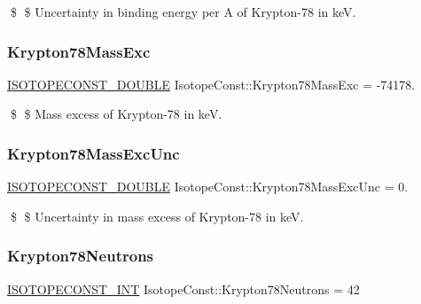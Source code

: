 \$ \$ Uncertainty in binding energy per A of Krypton-\/78 in keV. \mbox{\label{group___isotope_const-_krypton-_kr78_gadaa8a09b24a22fd688ae5db93b627695}} 
\subsubsection{\texorpdfstring{Krypton78\+Mass\+Exc}{Krypton78MassExc}}
{\footnotesize\ttfamily \mbox{\hyperlink{group___isotope_const-_macros_ga8f45a7272ce02c0b4c65c44636ed719a}{I\+S\+O\+T\+O\+P\+E\+C\+O\+N\+S\+T\+\_\+\+D\+O\+U\+B\+LE}} Isotope\+Const\+::\+Krypton78\+Mass\+Exc = -\/74178.}

\$ \$ Mass excess of Krypton-\/78 in keV. \mbox{\label{group___isotope_const-_krypton-_kr78_ga22d518fd6503c6df3ce0cb87b3fb03a9}} 
\subsubsection{\texorpdfstring{Krypton78\+Mass\+Exc\+Unc}{Krypton78MassExcUnc}}
{\footnotesize\ttfamily \mbox{\hyperlink{group___isotope_const-_macros_ga8f45a7272ce02c0b4c65c44636ed719a}{I\+S\+O\+T\+O\+P\+E\+C\+O\+N\+S\+T\+\_\+\+D\+O\+U\+B\+LE}} Isotope\+Const\+::\+Krypton78\+Mass\+Exc\+Unc = 0.}

\$ \$ Uncertainty in mass excess of Krypton-\/78 in keV. \mbox{\label{group___isotope_const-_krypton-_kr78_gafcdc107b6460f565f6d35a0d9401c59d}} 
\subsubsection{\texorpdfstring{Krypton78\+Neutrons}{Krypton78Neutrons}}
{\footnotesize\ttfamily \mbox{\hyperlink{group___isotope_const-_macros_ga5f18360b3e99483a35c32d789e62621c}{I\+S\+O\+T\+O\+P\+E\+C\+O\+N\+S\+T\+\_\+\+I\+NT}} Isotope\+Const\+::\+Krypton78\+Neutrons = 42}

